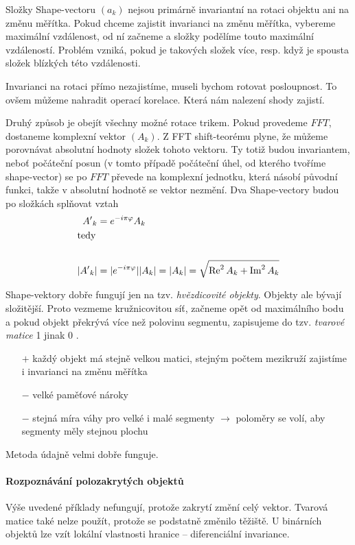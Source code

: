 Složky Shape-vectoru $(a_k)$ nejsou primárně invariantní na rotaci objektu ani na změnu měřítka. Pokud chceme 
zajistit invarianci na změnu měřítka, vybereme maximální vzdálenost, od ní začneme a složky podělíme touto maximální
vzdáleností. Problém vzniká, pokud je takových složek více, resp. když je spousta složek blízkých této vzdálenosti.

Invarianci na rotaci přímo nezajistíme, museli bychom rotovat posloupnost. To ovšem můžeme nahradit operací
korelace. Která nám nalezení shody zajistí.

Druhý způsob je obejít všechny možné rotace trikem.
Pokud provedeme $FFT$, dostaneme komplexní vektor $(A_k)$. Z FFT shift-teorému plyne, že můžeme porovnávat 
absolutní hodnoty složek tohoto vektoru. Ty totiž budou invariantem, neboť počáteční posun (v tomto případě počáteční úhel,
od kterého tvoříme shape-vector) se po $FFT$ převede na komplexní jednotku, která násobí původní funkci, takže v absolutní
hodnotě se vektor nezmění. Dva Shape-vectory budou po složkách splňovat vztah
\begin{align}
{A'}_k &= e^{-i\pi\varphi}A_k\\
\noalign{\hbox{tedy}\nonumber}\\
|{A'}_k| &= |e^{-i\pi\varphi}||A_k|=|A_k|=\sqrt{\Re^2A_k+\Im^2A_k}
\end{align}

Shape-vektory dobře fungují jen na tzv. \emph{hvězdicovité objekty}. Objekty ale bývají složitější. Proto vezmeme
kružnicovitou síť, začneme opět od maximálního bodu a pokud objekt překrývá více než polovinu segmentu, zapisujeme
do tzv. \emph{tvarové matice} 1 jinak 0 . 
\begin{itemize}
	\item[$+$] každý objekt má stejně velkou matici, stejným počtem mezikruží zajistíme i invarianci na změnu měřítka
	\item[$-$] velké paměťové nároky
	\item[$-$] stejná míra váhy pro velké i malé segmenty $\rightarrow$ poloměry se volí, aby segmenty měly stejnou plochu
\end{itemize}
Metoda údajně velmi dobře funguje.

\paragraph{Rozpoznávání polozakrytých objektů}
Výše uvedené příklady nefungují, protože zakrytí změní celý vektor. Tvarová matice také nelze použít, protože se
podstatně změnilo těžiště. U binárních objektů lze vzít lokální vlastnosti hranice -- diferenciální invariance.

